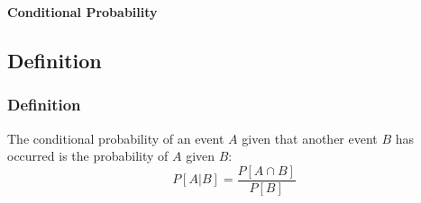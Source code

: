 \begin{frame}
    \Huge
    \begin{center}
        \textbf{Conditional Probability}
    \end{center}
\end{frame}

\subsection{Definition}\label{subsec:definition2}
\begin{frame}
    \frametitle{Definition}
    \begin{block}{}
        The conditional probability of an event $A$ given that another event $B$ has occurred is the probability of $A$ given $B$:
        \begin{equation}
            P[A|B] = \frac{P[A \cap B]}{P[B]}\label{eq:equation21}
        \end{equation}
    \end{block}
\end{frame}
